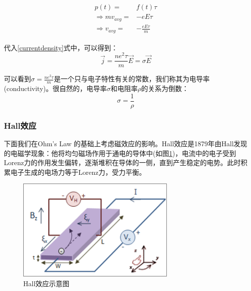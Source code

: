 \documentclass{ctexart}
\begin{document}
            \begin{align}
                \begin{split}
                    p(t)=&f(t)\tau\\
                    \Rightarrow mv_{avg}=&-eE\tau\\
                     \Rightarrow v_{avg}=&-\frac{eE\tau}{m}
                \end{split}
            \end{align}
               

            代入\eqref{currentdensity}式中，可以得到：
            \begin{equation}
                \vec{j}=\frac{ne^2\tau}{m}\vec{E}=\sigma\vec{E}
            \end{equation}
            
             可以看到$\sigma=\frac{ne^2\tau}{m}$是一个只与电子特性有关的常数，我们称其为电导率(conductivity)。很自然的，电导率$\sigma$和电阻率$\rho$的关系为倒数：
             \begin{equation}
                 \sigma = \frac{1}{\rho}
             \end{equation}
             
             \subsubsection{Hall效应}
                下面我们在Ohm's Law 的基础上考虑磁效应的影响。Hall效应是1879年由Hall发现的电磁学现象：他将均匀磁场作用于通电的导体中(如图\ref{fig:Halleffect})，电流中的电子受到Lorenz力的作用发生偏转，逐渐堆积在导体的一侧，直到产生稳定的电势。此时积累电子生成的电场力等于Lorenz力，受力平衡。
                \begin{figure}[H]
                    \centering
                    \includegraphics[width=0.7\textwidth]{figure/Hall_Effect.png}
                    \caption{Hall效应示意图}
                    \label{fig:Halleffect}
                \end{figure}
                
\end{document}
